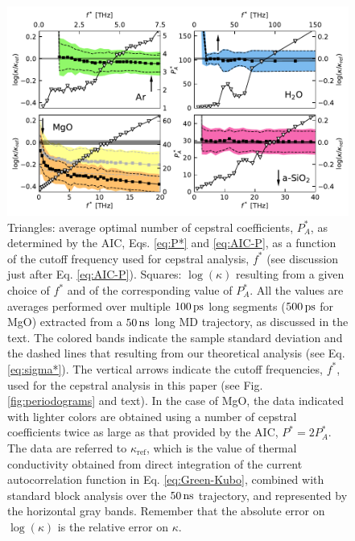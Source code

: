 \begin{figure}[!htb]
\centering
\includegraphics[width=\textwidth]{chapters/chapter5/figures/kappa_vs_fstar.pdf}
\caption{Triangles: average optimal number of cepstral coefficients, $P_A^*$, as determined by the AIC, Eqs. \eqref{eq:P*} and \eqref{eq:AIC-P}, as a function of the cutoff frequency used for cepstral analysis, $f^*$ (see discussion just after Eq. \eqref{eq:AIC-P}). Squares: $\log(\kappa)$ resulting from a given choice of $f^*$ and of the corresponding value of $P_A^*$. All the values are averages performed over multiple $100\,\mathrm{ps}$ long segments ($500\,\mathrm{ps}$ for MgO) extracted from a $50\,\mathrm{ns}$ long MD trajectory, as discussed in the text. The colored bands indicate the sample standard deviation and the dashed lines that resulting from our theoretical analysis (see Eq. \eqref{eq:sigma*}). The vertical arrows indicate the cutoff frequencies, $f^*$, used for the cepstral analysis in this paper (see Fig. \ref{fig:periodograms} and text). In the case of MgO, the data indicated with lighter colors are obtained using a number of cepstral coefficients twice as large as that provided by the AIC, $P^*=2P_A^*$. The data are referred to $\kappa_{\mathrm{ref}}$, which is the value of thermal conductivity obtained from direct integration of the current autocorrelation function in Eq. \eqref{eq:Green-Kubo}, combined with standard block analysis over the $50\,\mathrm{ns}$ trajectory, and represented by the horizontal gray bands. Remember that the absolute error on $\log(\kappa)$ is the relative error on $\kappa$.
}
\label{fig:kappa_vs_fstar}
\end{figure}

